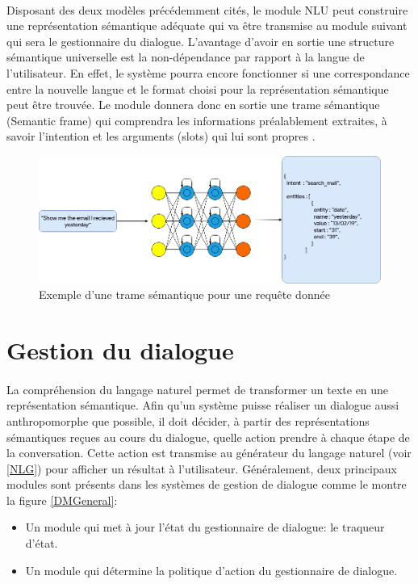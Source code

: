 \paragraph{}
Disposant des deux modèles précédemment cités, le module NLU peut construire une représentation sémantique adéquate qui va être transmise au module suivant qui sera le gestionnaire du dialogue. L'avantage d'avoir en sortie une structure sémantique universelle est la non-dépendance par rapport à la langue de l'utilisateur. En effet, le système pourra encore fonctionner si une correspondance entre la nouvelle langue et le format choisi pour la représentation sémantique peut être trouvée. Le module donnera donc en sortie une trame sémantique (Semantic frame) qui comprendra les informations préalablement extraites, à savoir l'intention et les arguments (slots) qui lui sont propres \citep{intent_classification,intent_slots,semantic_frame}.
\begin{figure}[H]
	\centering
	\includegraphics[width=0.80\linewidth]{images/NLU/semantic_frames.png}
	\caption{Exemple d'une trame sémantique pour une requête donnée}
	\label{fig:semanticFrame}
\end{figure} 
\section{Gestion du dialogue}
\paragraph{}
La compréhension du langage naturel permet de transformer un texte en une représentation sémantique. Afin qu'un système puisse réaliser un dialogue aussi anthropomorphe que possible, il doit décider, à partir des représentations sémantiques reçues au cours du dialogue, quelle action prendre à chaque étape de la conversation. Cette action est transmise au générateur du langage naturel (voir \ref{NLG}) pour afficher un résultat à l'utilisateur. Généralement, deux principaux modules sont présents dans les systèmes de gestion de dialogue comme le montre la figure \ref{DMGeneral}:
\begin{itemize}
	\item Un module qui met à jour l'état du gestionnaire de dialogue: le traqueur d'état.
	\item Un module qui détermine la politique d'action du gestionnaire de dialogue.
\end{itemize}

